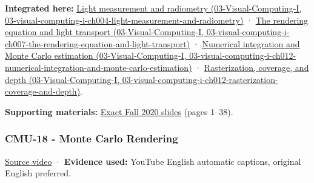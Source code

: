 \textbf{Integrated here:} \href{../03-Visual-Computing-I/main.pdf\#nameddest=03-visual-computing-i-ch004-light-measurement-and-radiometry}{Light measurement and radiometry (03-Visual-Computing-I, 03-visual-computing-i-ch004-light-measurement-and-radiometry)} · \href{../03-Visual-Computing-I/main.pdf\#nameddest=03-visual-computing-i-ch007-the-rendering-equation-and-light-transport}{The rendering equation and light transport (03-Visual-Computing-I, 03-visual-computing-i-ch007-the-rendering-equation-and-light-transport)} · \href{../03-Visual-Computing-I/main.pdf\#nameddest=03-visual-computing-i-ch012-numerical-integration-and-monte-carlo-estimation}{Numerical integration and Monte Carlo estimation (03-Visual-Computing-I, 03-visual-computing-i-ch012-numerical-integration-and-monte-carlo-estimation)} · \href{../03-Visual-Computing-I/main.pdf\#nameddest=03-visual-computing-i-ch012-rasterization-coverage-and-depth}{Rasterization, coverage, and depth (03-Visual-Computing-I, 03-visual-computing-i-ch012-rasterization-coverage-and-depth)}.

\textbf{Supporting materials:} \href{https://15462.courses.cs.cmu.edu/fall2020content/lectures/17_numericalintegration/17_numericalintegration_slides.pdf}{Exact Fall 2020 slides} (pages 1--38).

\subsubsection{CMU-18 - Monte Carlo Rendering}\label{04-visual-computing-ii-ch036-cmu-18---monte-carlo-rendering}

\href{https://www.youtube.com/watch?v=FUZJNlRqrAc}{Source video} · \textbf{Evidence used:} YouTube English automatic captions, original English preferred.

